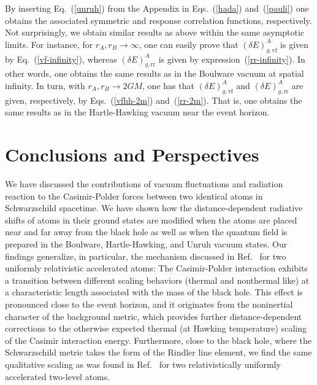\documentclass[twocolumn,prd,aps,showpacs,amsmath,amssymb]{revtex4-1}
\begin{document}
By inserting Eq.~(\ref{unruh}) from the Appendix in Eqs.~(\ref{hada}) and~(\ref{pauli}) one obtains the associated symmetric and response correlation functions, respectively. Not surprisingly, we obtain similar results as above within the same asymptotic limits.
For instance, for $r_{A}, r_{B} \to \infty$, one can easily
prove that $(\delta E)^{A}_{g,\textrm{vf}}$ is given by
Eq.~(\ref{vf-infinity}), whereas $(\delta E)^{A}_{g,\textrm{rr}}$ is
given by expression~(\ref{rr-infinity}). In other words, one obtains
the same results as in the Boulware vacuum at spatial infinity. In
turn, with $r_{A}, r_{B} \to 2GM$, one has that $(\delta
E)^{A}_{g,\textrm{vf}}$ and $(\delta E)^{A}_{g,\textrm{rr}}$ are given,
respectively, by Eqs.~(\ref{vfhh-2m}) and~(\ref{rr-2m}). That is, one
obtains the same results as in the Hartle-Hawking vacuum near the
event horizon.  


\section{Conclusions and Perspectives}
\label{conclude}

We have discussed the contributions of vacuum fluctuations and
radiation reaction to the Casimir-Polder forces between two identical
atoms in Schwarzschild spacetime.
%
We have shown how the distance-dependent radiative shifts of
atoms in their ground states are modified when the atoms are placed near and far
away from the black hole as well as when the quantum field is prepared
in the Boulware, Hartle-Hawking, and Unruh vacuum states.  
%
Our findings generalize, in particular, the  mechanism discussed in
Ref.~\cite{marino} for two uniformly relativistic accelerated atoms:
The Casimir-Polder interaction exhibits a transition between different
scaling behaviors (thermal and nonthermal like) at a characteristic
length associated with the mass of the black hole. This effect is
pronounced close  to the event horizon, and it originates from the
noninertial character of the background metric, which provides further
distance-dependent corrections to the otherwise expected thermal (at
Hawking temperature) scaling of the Casimir interaction energy. 
%
Furthermore, close to the black hole, where the Schwarzschild metric
takes the form of the Rindler line element, we find the same
qualitative scaling as was found in Ref.~\cite{marino} for two
relativistically uniformly accelerated two-level atoms.  
%
\end{document}
